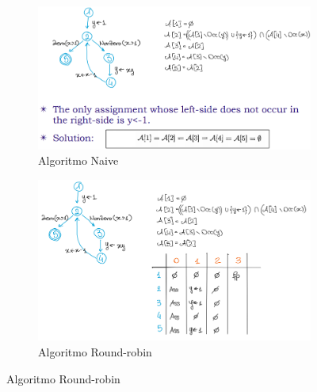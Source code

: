 \documentclass[a4paper,oneside,titlepage]{book}
\begin{document}
\begin{figure}[htp]
	\begin{subfigure}{0.49\textwidth}
	    \centering
		\includegraphics[width=\textwidth, height=\textheight, keepaspectratio]{availExp8.png}
		\caption{Algoritmo Naive}
	\end{subfigure}
	\hfill
	\begin{subfigure}{0.49\textwidth}
	    \centering
		\includegraphics[width=\textwidth, height=\textheight, keepaspectratio]{availExp9.png} 
		\caption{Algoritmo Round-robin}
	\end{subfigure}
\end{figure}
\end{document}
